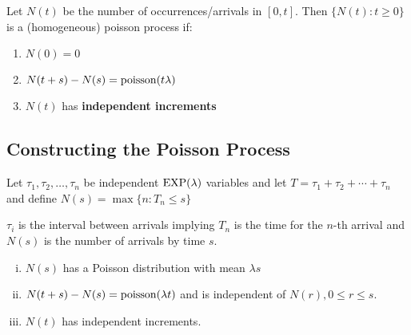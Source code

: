 \documentclass[12pt,a4paper]{article}
\begin{document}
\begin{defn}
Let $N(t)$ be the number of occurrences/arrivals in $[0,t]$. Then $\{N(t) : t\geq 0\}$ is a (homogeneous) poisson process if:
\begin{enumerate}[(1)]
\item $N(0) = 0$
\item $N(t+s) - N(s) = \mathrm{poisson}(t\lambda)$
\item $N(t)$ has \textbf{independent increments}
\end{enumerate}
\end{defn}
\newpage
\subsection{Constructing the Poisson Process}
\begin{defn}[]
Let $\tau_1, \tau_2, \ldots, \tau_n$ be independent $\mathrm{EXP}(\lambda)$ variables and let 
$T = \tau_1 + \tau_2 + \cdots + \tau_n$ and define $N(s) = \max\{n : T_n \leq s\}$
\end{defn}
$\tau_i$ is the interval between arrivals implying $T_n$ is the time for the $n$-th arrival and $N(s)$ is the number of arrivals by time $s$. 

\begin{enumerate}[(i)]
\item $N(s)$ has a Poisson distribution with mean $\lambda s$
\item $N(t+s) - N(s) = \mathrm{poisson}(\lambda t)$ and is independent of $N(r), 0 \leq r\leq s$. 
\item $N(t)$ has independent increments.  
\end{enumerate}
\newpage
\end{document}

